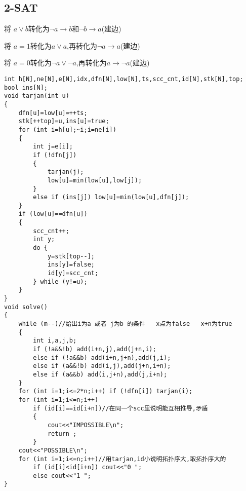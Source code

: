 \documentclass[a4paper]{ctexart}
\begin{document}
\subsection{2-SAT}

将 $a\lor b$转化为$\neg a\rightarrow b$和$\neg b\rightarrow a$(建边)

将 $a=1$转化为$a\lor a$,再转化为$\neg a\rightarrow a$(建边)

将 $a=0$转化为$\neg a \lor \neg a$,再转化为$a\rightarrow \neg a$(建边)

\begin{lstlisting}
int h[N],ne[N],e[N],idx,dfn[N],low[N],ts,scc_cnt,id[N],stk[N],top;
bool ins[N];
void tarjan(int u)
{
    dfn[u]=low[u]=++ts;
    stk[++top]=u,ins[u]=true;
    for (int i=h[u];~i;i=ne[i])
    {
        int j=e[i];
        if (!dfn[j])
        {
            tarjan(j);
            low[u]=min(low[u],low[j]);
        }
        else if (ins[j]) low[u]=min(low[u],dfn[j]);
    }
    if (low[u]==dfn[u])
    {
        scc_cnt++;
        int y;
        do {
            y=stk[top--];
            ins[y]=false;
            id[y]=scc_cnt;
        } while (y!=u);
    }
}
void solve()
{
    while (m--)//给出i为a 或者 j为b 的条件   x点为false   x+n为true
    {
        int i,a,j,b;
        if (!a&&!b) add(i+n,j),add(j+n,i);
        else if (!a&&b) add(i+n,j+n),add(j,i);
        else if (a&&!b) add(i,j),add(j+n,i+n);
        else if (a&&b) add(i,j+n),add(j,i+n);
    }
    for (int i=1;i<=2*n;i++) if (!dfn[i]) tarjan(i);
    for (int i=1;i<=n;i++)
        if (id[i]==id[i+n])//在同一个scc里说明能互相推导,矛盾
        {
            cout<<"IMPOSSIBLE\n";
            return ;
        }
    cout<<"POSSIBLE\n";
    for (int i=1;i<=n;i++)//用tarjan,id小说明拓扑序大,取拓扑序大的
        if (id[i]<id[i+n]) cout<<"0 ";
        else cout<<"1 ";
}
\end{lstlisting}
\end{document}
